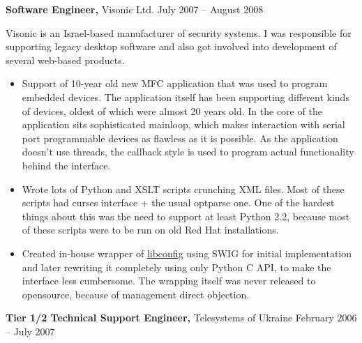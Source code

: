 \documentclass[margin]{res}
\begin{document}
\begin{resume}
{\bf Software Engineer,} Visonic Ltd. \hfill July 2007 -- August 2008

Visonic is an Israel-based manufacturer of security systems.
I was responsible for supporting legacy desktop software and
also got involved into development of several web-based
products.\\

\begin{itemize} \itemsep -1pt
\item Support of 10-year old new MFC application
  that was used to program embedded devices. The application itself
  has been supporting different kinds of devices, oldest of which
  were almost 20 years old. In the core of the application sits
  sophisticated mainloop, which makes interaction with serial port
  programmable devices as flawless as it is possible.
  As the application doesn't use threads, the callback style is
  used to program actual functionality behind the interface.
\item Wrote lots of Python and XSLT scripts
  crunching XML files. Most of these scripts had curses interface +
  the usual optparse one. One of the hardest things about this was
  the need to support at least Python 2.2, because most of these scripts
  were to be run on old Red Hat installations.
\item Created in-house wrapper of
  \href{http://www.hyperrealm.com/libconfig/}{libconfig} using SWIG for initial
  implementation and later rewriting it completely using only Python C API, to make
  the interface less cumbersome. The wrapping itself was never released to
  opensource, because of management direct objection.
\end{itemize}



{\bf Tier 1/2 Technical Support Engineer,} Telesystems of Ukraine \hfill February 2006 -- July 2007





\end{resume}
\end{document}
